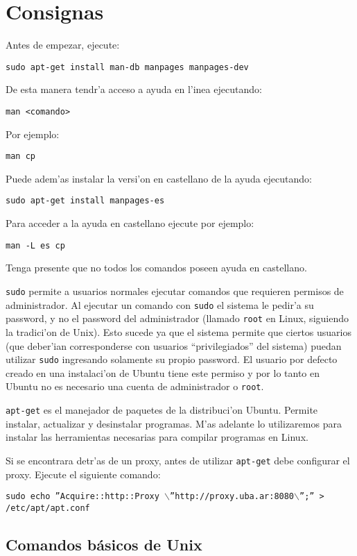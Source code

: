 \section{Consignas}

Antes de empezar, ejecute:

\texttt{sudo apt-get install man-db manpages manpages-dev}

De esta manera tendr'a acceso a ayuda en l'inea ejecutando:

\texttt{man <comando>}

Por ejemplo:

\texttt{man cp}

Puede adem'as instalar la versi'on en castellano de la ayuda ejecutando:

\texttt{sudo apt-get install manpages-es}

Para acceder a la ayuda en castellano ejecute por ejemplo:

\texttt{man -L es cp}

Tenga presente que no todos los comandos poseen ayuda en castellano.

\texttt{sudo} permite a usuarios normales ejecutar comandos que requieren permisos de administrador.
Al ejecutar un comando con \texttt{sudo} el sistema le pedir'a su password, y no el password del administrador
(llamado \texttt{root} en Linux, siguiendo la tradici'on de Unix). Esto sucede ya que el sistema permite que
ciertos usuarios (que deber'ian corresponderse con usuarios ``privilegiados'' del sistema) puedan utilizar \texttt{sudo}
ingresando solamente su propio password. El usuario por defecto creado en una instalaci'on de Ubuntu tiene este permiso
y por lo tanto en Ubuntu no es necesario una cuenta de administrador o \texttt{root}.

\texttt{apt-get} es el manejador de paquetes de la distribuci'on Ubuntu. Permite instalar, actualizar y desinstalar
programas. M'as adelante lo utilizaremos para instalar las herramientas necesarias para compilar programas en
Linux.

Si se encontrara detr'as de un proxy, antes de utilizar \texttt{apt-get} debe configurar el proxy. Ejecute el siguiente
comando:

\small
\texttt{sudo echo ''Acquire::http::Proxy $\backslash$''http://proxy.uba.ar:8080$\backslash$'';'' > /etc/apt/apt.conf}
\normalsize

\subsection{Comandos b\'asicos de Unix}


